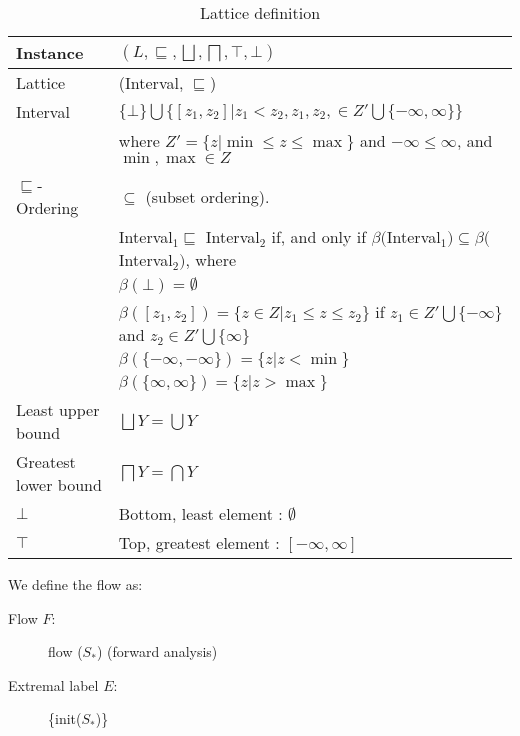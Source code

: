 \begin{table}[H]
\begin{tabular}{| l | l |}
  \hline
  Instance & $(L,\sqsubseteq,\bigsqcup, \bigsqcap, \top, \bot )$ \\
  \hline
  \hline
  Lattice  & (Interval, $\sqsubseteq$) \\
  \hline
  Interval & $\{\bot\} \bigcup \{[z_1, z_2] | z_1 < z_2, z_1, z_2, \in Z' \bigcup \{- \infty, \infty \} \} $ \\
           & where $Z' = \{ z | \min \leq z \leq \max \}$ and $ - \infty \leq \infty $, and $ \min, \max \in Z$ \\
           \hline
   $\sqsubseteq$-Ordering &  $\subseteq$ (subset ordering).\\
                          & Interval$_1 \sqsubseteq $ Interval$_2 $ if, and only if $\beta($Interval$_1) \subseteq \beta($Interval$_2)$, where \\
                          & $\beta(\bot) = \emptyset$ \\
                          & $\beta([z_1, z_2]) = \{ z \in Z | z_1 \leq z \leq z_2\} $ if $z_1 \in Z' \bigcup \{  -\infty\} $ and $ z_2 \in Z' \bigcup \{\infty\}$ \\
                          & $\beta(\{-\infty, -\infty\}) = \{z | z < \min\}$ \\
                          & $\beta(\{\infty, \infty\}) = \{z | z > \max\}$ \\
   \hline
   Least upper bound      & $\bigsqcup Y = \bigcup Y$\\
   \hline
   Greatest lower bound   & $\bigsqcap Y = \bigcap Y$\\
   \hline
   $\bot$                 & Bottom, least element : $\emptyset$\\
   \hline
   $\top$                 & Top, greatest element : $[-\infty, \infty]$\\
\hline   
\end{tabular}
  \centering
  \caption{Lattice definition}
  \label{table:latticedefinition}
\end{table}
\noindent We define the flow as:

\begin{description}
  \item[Flow $F$:] flow ($S_*$) (forward analysis)
  \item[Extremal label $E$:] \{init($S_*$)\}
\end{description}

